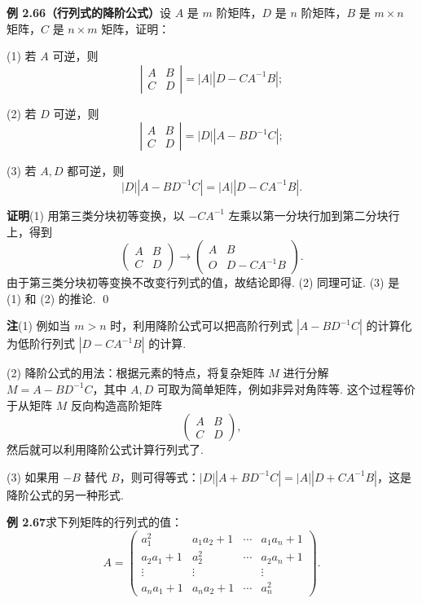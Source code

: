 \documentclass[UTF8,12pt,a4paper,fontset=fandol]{ctexart}
\begin{document}
\noindent\textbf{例 2.66（行列式的降阶公式）}\quad 设 $A$ 是 $m$ 阶矩阵，$D$ 是 $n$ 阶矩阵，$B$ 是 $m\times n$ 矩阵，$C$ 是 $n\times m$ 矩阵，证明：

(1) 若 $A$ 可逆，则
\[
\left|
\begin{array}{cc}
A & B\\
C & D
\end{array}
\right|
=|A||D-CA^{-1}B|;
\]

(2) 若 $D$ 可逆，则
\[
\left|
\begin{array}{cc}
A & B\\
C & D
\end{array}
\right|
=|D||A-BD^{-1}C|;
\]

(3) 若 $A,D$ 都可逆，则
\[
|D||A-BD^{-1}C|=|A||D-CA^{-1}B|.
\]

\noindent\textbf{证明}\quad (1) 用第三类分块初等变换，以 $-CA^{-1}$ 左乘以第一分块行加到第二分块行上，得到
\[
\left(
\begin{array}{cc}
A & B\\
C & D
\end{array}
\right)
\to
\left(
\begin{array}{cc}
A & B\\
O & D-CA^{-1}B
\end{array}
\right).
\]
由于第三类分块初等变换不改变行列式的值，故结论即得. (2) 同理可证. (3) 是 (1) 和 (2) 的推论. \qed

\noindent\textbf{注}\quad (1) 例如当 $m>n$ 时，利用降阶公式可以把高阶行列式 $|A-BD^{-1}C|$ 的计算化为低阶行列式 $|D-CA^{-1}B|$ 的计算.

(2) 降阶公式的用法：根据元素的特点，将复杂矩阵 $M$ 进行分解 $M=A-BD^{-1}C$，其中 $A,D$ 可取为简单矩阵，例如非异对角阵等. 这个过程等价于从矩阵 $M$ 反向构造高阶矩阵
\[
\left(
\begin{array}{cc}
A & B\\
C & D
\end{array}
\right),
\]
然后就可以利用降阶公式计算行列式了.

(3) 如果用 $-B$ 替代 $B$，则可得等式：$|D||A+BD^{-1}C|=|A||D+CA^{-1}B|$，这是降阶公式的另一种形式.

\noindent\textbf{例 2.67}\quad 求下列矩阵的行列式的值：
\[
A=
\left(
\begin{array}{cccc}
a_1^2 & a_1a_2+1 & \cdots & a_1a_n+1\\
a_2a_1+1 & a_2^2 & \cdots & a_2a_n+1\\
\vdots & \vdots & & \vdots\\
a_na_1+1 & a_na_2+1 & \cdots & a_n^2
\end{array}
\right).
\]
\end{document}

